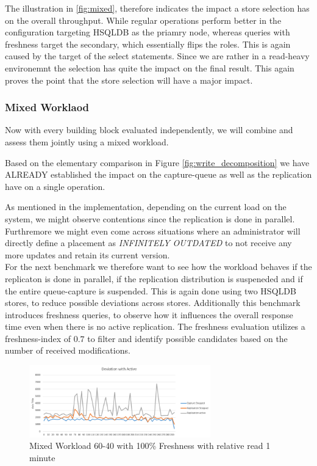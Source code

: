 The illustration in \ref{fig:mixed}, therefore indicates the impact a store selection has on the overall throughput.
While regular operations perform better in the configuration targeting HSQLDB as the priamry node,
whereas queries with freshness target the secondary, which essentially flips the roles.
This is again caused by the target of the select statements. 
Since we are rather in a read-heavy environemnt the selection has quite the impact on the final result.
This again proves the point that the store selection will have a major impact.


\subsubsection{Mixed Worklaod} 

Now with every building block evaluated independently, we will combine and assess them jointly using a mixed workload.



Based on the elementary comparison in Figure \ref{fig:write_decomposition} we have ALREADY established the impact on the capture-queue as well as the 
replication have on a single operation.

As mentioned in the implementation, depending on the current load on the system, we might observe contentions since the replication is done in parallel.
Furthremore we might even come across situations where an administrator will directly define a placement as \emph{INFINITELY OUTDATED} to not receive any more updates
and retain its current version.\\
For the next benchmark we therefore want to see how the workload behaves if the replicaton is done in parallel, if the replication distribution is suspeneded
and if the entire queue-capture is suspended.
This is again done using two HSQLDB stores, to reduce possible deviations across stores. 
Additionally this benchmark introduces freshness queries, to observe how it influences the overall response time even when there is no active replication. 
The freshness evaluation utilizes a freshness-index of $0.7$ to filter and identify possible candidates based on the number of received modifications.


\begin{figure}[t] 
    \centering 
    \includegraphics[width=0.7\textwidth]{Figures/deviation_with_active_que.PNG}
    \caption{Mixed Workload 60-40 with 100\% Freshness with relative read 1 minute }
    \label{fig:replication_impact}
\end{figure}

